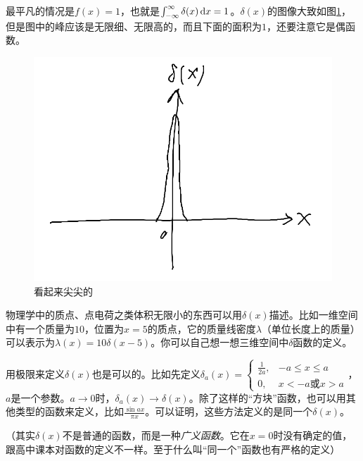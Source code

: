 最平凡的情况是$f(x)=1$，也就是$\int_{-\infty}^{\infty} \delta(x) \mathop{}\!\mathrm{d} x=1$。$\delta(x)$的图像大致如图\ref{fig-delta-x}，但是图中的峰应该是无限细、无限高的，而且下面的面积为$1$，还要注意它是偶函数。
\begin{figure}[htb]
\centering
\includegraphics[scale=0.5]{fig/delta-x}
\caption{看起来尖尖的}
\label{fig-delta-x}
\end{figure}

物理学中的质点、点电荷之类体积无限小的东西可以用$\delta(x)$描述。比如一维空间中有一个质量为$10$，位置为$x=5$的质点，它的质量线密度$\lambda$（单位长度上的质量）可以表示为$\lambda(x)=10 \delta(x-5)$。你可以自己想一想三维空间中$\delta$函数的定义。

用极限来定义$\delta(x)$也是可以的。比如先定义$\delta_a(x)=\begin{cases} \frac{1}{2 a}, &-a \le x \le a \\ 0, &x<-a \text{或} x>a \end{cases}$，$a$是一个参数。$a \rightarrow 0$时，$\delta_a(x) \rightarrow \delta(x)$。除了这样的“方块”函数，也可以用其他类型的函数来定义，比如$\frac{\sin a x}{\pi x}$。可以证明，这些方法定义的是同一个$\delta(x)$。

（其实$\delta(x)$不是普通的函数，而是一种\emph{广义函数}。它在$x=0$时没有确定的值，跟高中课本对函数的定义不一样。至于什么叫“同一个”函数也有严格的定义）


